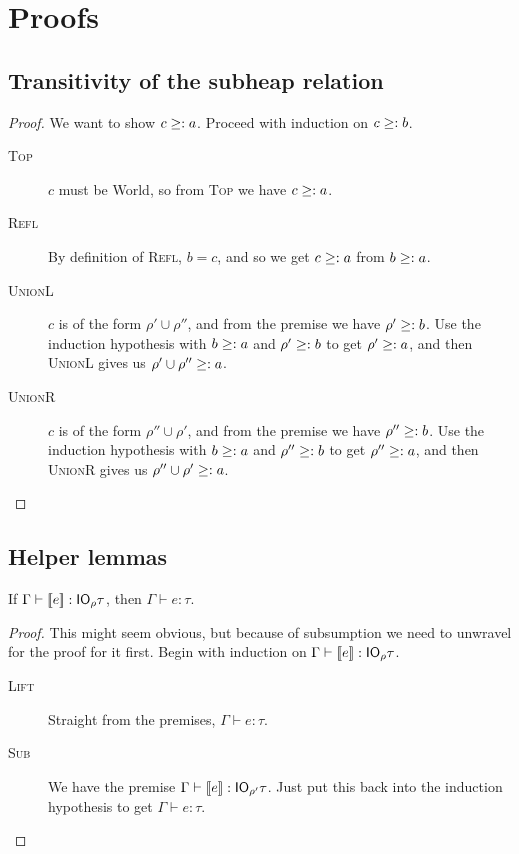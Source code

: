 \chapter{Proofs}

\section{Transitivity of the subheap relation}\label{proof:subheaptransitive}
\begin{proof}
  We want to show $c \geq: a$. Proceed with induction on $c \geq: b$.
  \begin{description}
  \item[\rm\textsc{Top}]
    $c$ must be \textsf{World}, so from \textsc{Top} we have $c
    \geq: a$.
  \item[\rm\textsc{Refl}] By definition of \textsc{Refl}, $b =
    c$, and so we get $c \geq: a$ from $b \geq: a$.
  \item[\rm\textsc{UnionL}] $c$ is of the form $\rho' \cup \rho''$, and
    from the premise we have $\rho' \geq: b$. Use the induction
    hypothesis with $b \geq: a$ and $\rho' \geq: b$ to get $\rho' \geq:
    a$, and then \textsc{UnionL} gives us $\rho' \cup \rho'' \geq: a$.
  \item[\rm\textsc{UnionR}]  $c$ is of the form $\rho'' \cup \rho'$, and
    from the premise we have $\rho'' \geq: b$. Use the induction
    hypothesis with $b \geq: a$ and $\rho'' \geq: b$ to get $\rho''
    \geq: a$, and then \textsc{UnionR} gives us $\rho'' \cup \rho' \geq: a$.
  \end{description}
\end{proof}

\section{Helper lemmas}
\begin{lemma}\label{lem:unwrapLift}
  If $\Gamma \vdash [\![ e]\!] : \mathsf{IO}_\rho \tau$, then $\Gamma \vdash e : \tau$.
\end{lemma}
\begin{proof}
  This might seem obvious, but because of subsumption we need to
  unwravel for the proof for it first. Begin with induction on $\Gamma \vdash
  [\![ e]\!] : \mathsf{IO}_\rho \tau$.
  \begin{description}
  \item[\rm\textsc{Lift}] Straight from the premises, $\Gamma \vdash e : \tau$.
  \item[\rm\textsc{Sub}] We have the premise ${\Gamma \vdash [\![ e]\!] : \mathsf{IO}_{\rho'}
    \tau}$. Just put this back into the induction hypothesis to get ${\Gamma \vdash e
    : \tau}$.
  \end{description}
\end{proof}

